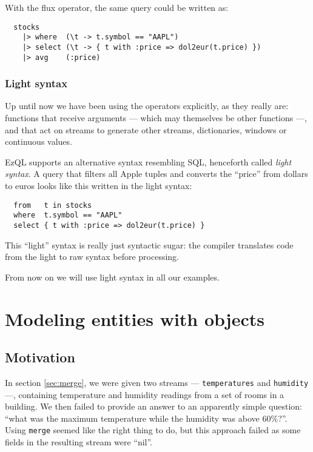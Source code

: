 \documentclass{report}
\begin{document}
With the flux operator, the same query could be written as:

\begin{verbatim}
  stocks
    |> where  (\t -> t.symbol == "AAPL")
    |> select (\t -> { t with :price => dol2eur(t.price) })
    |> avg    (:price)
\end{verbatim}

\subsection{Light syntax}
\label{sec:light-syntax}

Up until now we have been using the operators explicitly, as they
really are: functions that receive arguments --- which may themselves
be other functions ---, and that act on streams to generate other
streams, dictionaries, windows or continuous values.

EzQL supports an alternative syntax resembling SQL, henceforth called
\emph{light syntax}. A query that filters all Apple tuples and
converts the ``price'' from dollars to euros looks like this written
in the light syntax:

\begin{verbatim}
  from   t in stocks
  where  t.symbol == "AAPL"
  select { t with :price => dol2eur(t.price) }
\end{verbatim}

This ``light'' syntax is really just syntactic sugar: the compiler
translates code from the light to raw syntax before processing.

From now on we will use light syntax in all our examples.

\chapter{Modeling entities with objects}
\label{chap:objects}

\section{Motivation}

In section \ref{sec:merge}, we were given two streams ---
\verb=temperatures= and \verb=humidity= ---, containing temperature
and humidity readings from a set of rooms in a building. We then
failed to provide an answer to an apparently simple question: ``what
was the maximum temperature while the humidity was above
60\%?''. Using \verb=merge= seemed like the right thing to do, but
this approach failed as some fields in the resulting stream were
``nil''.
\end{document}
